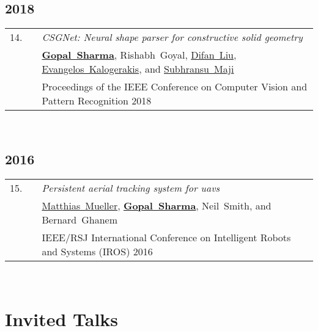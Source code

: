 \documentclass[11pt,letter,sans]{moderncv}
\begin{document}
\subsection{2018}

\begin{minipage}{\textwidth}
\begin{tabular}[t]{p{8mm}p{1mm}>{\raggedright\arraybackslash}p{6.5in}}
 \hfill14.\hspace*{1mm} && \textit{CSGNet: Neural shape parser for constructive solid geometry}  \\
 && \mbox{\textbf{\href{hippogriff.github.io}{Gopal Sharma}}}, \mbox{Rishabh Goyal}, \mbox{\href{}{Difan Liu}}, \mbox{\href{}{Evangelos Kalogerakis}}, and \mbox{\href{}{Subhransu Maji}} \\
 && Proceedings of the IEEE Conference on Computer Vision and Pattern Recognition 2018  \\
\end{tabular} \\[2mm]
\end{minipage}
\subsection{2016}

\begin{minipage}{\textwidth}
\begin{tabular}[t]{p{8mm}p{1mm}>{\raggedright\arraybackslash}p{6.5in}}
 \hfill15.\hspace*{1mm} && \textit{Persistent aerial tracking system for uavs}  \\
 && \mbox{\href{}{Matthias Mueller}}, \mbox{\textbf{\href{hippogriff.github.io}{Gopal Sharma}}}, \mbox{Neil Smith}, and \mbox{Bernard Ghanem} \\
 && 2016 IEEE/RSJ International Conference on Intelligent Robots and Systems (IROS) 2016  \\
\end{tabular} \\[2mm]
\end{minipage}
\clearpage
\section{Invited Talks}
\end{document}
